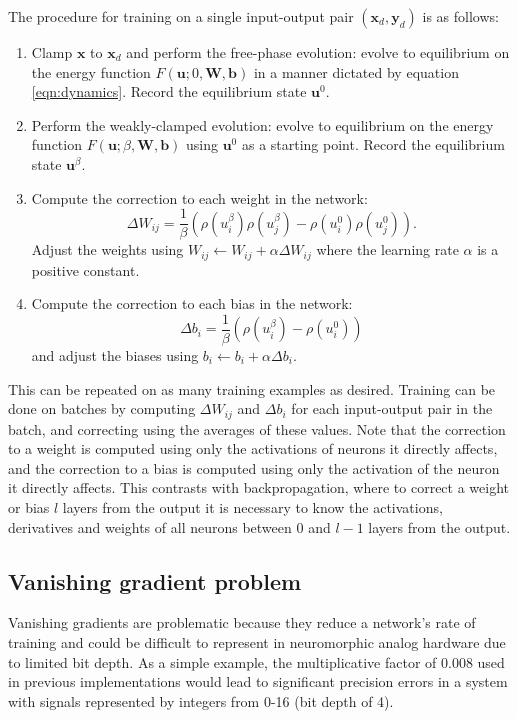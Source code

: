 \documentclass[utf8]{frontiersSCNS}
\newcommand{\mtx}[1]{\mathbf{#1}}
\begin{document}
The procedure for training on a single input-output pair $(\mtx{x}_d,\mtx{y}_d)$ is as follows:
\begin{enumerate}
\item Clamp $\mtx{x}$ to $\mtx{x}_d$ and perform the free-phase evolution: evolve to equilibrium on the energy function $F(\mtx{u}; 0, \mtx{W}, \mtx{b})$ in a manner dictated by equation \ref{eqn:dynamics}. Record the equilibrium state $\mtx{u}^0$.
\item Perform the weakly-clamped evolution: evolve to equilibrium on the energy function $F(\mtx{u}; \beta, \mtx{W}, \mtx{b})$ using $\mtx{u}^0$ as a starting point. Record the equilibrium state $\mtx{u}^{\beta}$.
\item Compute the correction to each weight in the network: 
\begin{equation}
\Delta W_{ij}=\frac{1}{\beta}(\rho(u_i^\beta)\rho(u_j^\beta)-\rho(u_i^0)\rho(u_j^0)). \label{eqn:weight_correction}
\end{equation}
Adjust the weights using $W_{ij}\leftarrow W_{ij}+\alpha\Delta W_{ij}$ where the learning rate $\alpha$ is a positive constant.
\item Compute the correction to each bias in the network:
\begin{equation}
\Delta b_i=\frac{1}{\beta}(\rho(u_i^{\beta})-\rho(u_i^0)) \label{eqn:bias_correction}
\end{equation}
and adjust the biases using $b_i\leftarrow b_i+\alpha\Delta b_i$.
\end{enumerate}
This can be repeated on as many training examples as desired. Training can be done on batches by computing $\Delta W_{ij}$ and $\Delta b_i$ for each input-output pair in the batch, and correcting using the averages of these values. Note that the correction to a weight is computed using only the activations of neurons it directly affects, and the correction to a bias is computed using only the activation of the neuron it directly affects. This contrasts with backpropagation, where to correct a weight or bias $l$ layers from the output it is necessary to know the activations, derivatives and weights of all neurons between $0$ and $l-1$ layers from the output.

\subsection{Vanishing gradient problem}
\label{sec:vangrad}

Vanishing gradients are problematic because they reduce a network's rate of training and could be difficult to represent in neuromorphic analog hardware due to limited bit depth. As a simple example, the multiplicative factor of 0.008 used in previous implementations would lead to significant precision errors in a system with signals represented by integers from 0-16 (bit depth of 4).
\end{document}
